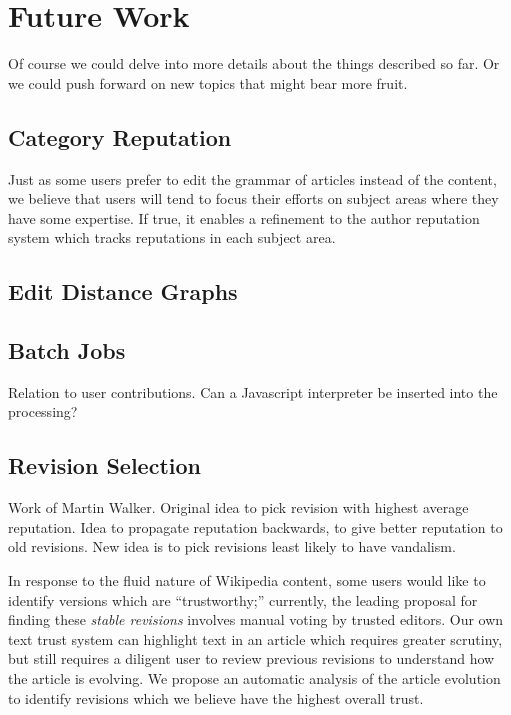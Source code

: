 \section{Future Work}

Of course we could delve into more details about
the things described so far.  Or we could push forward
on new topics that might bear more fruit.

\subsection{Category Reputation}

Just as some users prefer to edit the grammar of
articles instead of the content, we believe that
users will tend to focus their efforts on subject
areas where they have some expertise.
If true, it enables a refinement to the author
reputation system which tracks reputations in
each subject area.


\subsection{Edit Distance Graphs}

\subsection{Batch Jobs}

    Relation to user contributions.
    Can a Javascript interpreter be inserted into the processing?

\subsection{Revision Selection}

    Work of Martin Walker.
    Original idea to pick revision with highest average reputation.
    Idea to propagate reputation backwards, to give better reputation
    to old revisions.
    New idea is to pick revisions least likely to have vandalism.

   In response to the fluid nature of Wikipedia content,
    some users would like to identify versions which
    are ``trustworthy;'' currently, the leading proposal
    for finding these \textit{stable revisions}
    involves manual voting by trusted editors.
    Our own text trust system can highlight text in
    an article which requires greater scrutiny, but
    still requires a diligent user to review previous
    revisions to understand how the article is evolving.
    We propose an automatic analysis of the article evolution
    to identify revisions which we believe
    have the highest overall trust.


